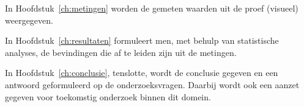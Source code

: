 
In Hoofdstuk~\ref{ch:metingen} worden de gemeten waarden uit de proef (visueel) weergegeven.

In Hoofdstuk~\ref{ch:resultaten} formuleert men, met behulp van statistische analyses, de bevindingen die af te leiden zijn uit de metingen.

In Hoofdstuk~\ref{ch:conclusie}, tenslotte, wordt de conclusie gegeven en een antwoord geformuleerd op de onderzoeksvragen. Daarbij wordt ook een aanzet gegeven voor toekomstig onderzoek binnen dit domein.